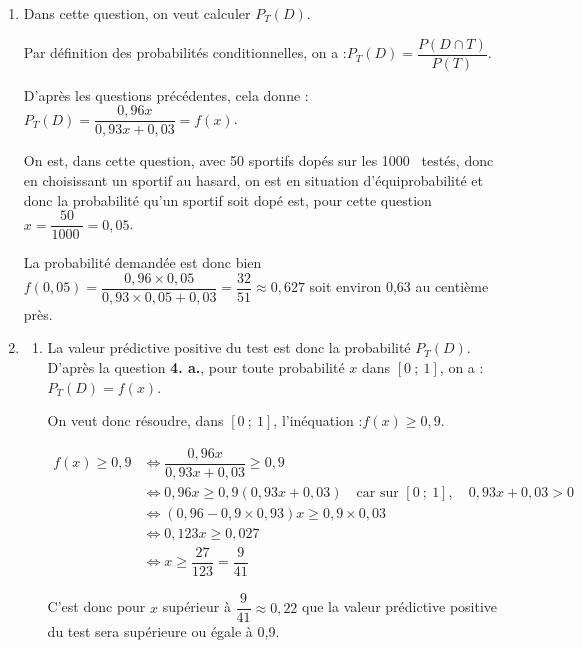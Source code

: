\documentclass[10pt]{article}
\providecommand{\np}[2][]{{#2~#1}}
\begin{document}
\begin{enumerate}
$\begin{aligned} P(T) &= P(D \cap T) + P(\overline{D} \cap T)\\
&= 0,96x + (1 - x) \times 0,03\\
&= 0,96x + 0,03 - 0,03x\\
&= 0,93x + 0,03\end{aligned}$

On arrive bien à la probabilité annoncée.

		\item Dans cette question, on veut calculer $P_T(D)$.

Par définition des probabilités conditionnelles, on a :\quad $P_T(D) = \dfrac{P(D \cap T)}{P(T)}$.

D'après les questions précédentes, cela donne :\quad $P_T(D) = \dfrac{0,96x}{0,93x + 0,03} = f(x)$.

On est, dans cette question, avec 50 sportifs dopés sur les \np{1000} testés, donc en choisissant un sportif au hasard, on est en situation d'équiprobabilité et donc la probabilité qu'un sportif soit dopé est, pour cette question $x = \dfrac{50}{\np{1000}} = 0,05$.

La probabilité demandée est donc bien $f(0,05) = \dfrac{0,96 \times 0,05}{0,93\times 0,05 + 0,03} = \dfrac{32}{51}\approx 0,627$ soit environ 0,63 au centième près.

		\item \begin{enumerate}
			\item La valeur prédictive positive du test est donc la probabilité $P_T(D)$. D'après la question \textbf{4. a.}, pour toute probabilité $x$ dans $ [0~;~1] $, on a :\quad $P_T(D)= f(x)$.

On veut donc résoudre, dans $ [0~;~1] $, l'inéquation :\quad $f(x) \geqslant 0,9$.

$\begin{aligned} f(x) \geqslant 0,9&\iff \dfrac{0,96x}{0,93x + 0,03 } \geqslant 0,9\\
&\iff 0,96x \geqslant 0,9 (0,93x+0,03) \quad \text{car sur } [0~;~1],\quad 0,93x + 0,03 >0\\
&\iff (0,96 - 0,9\times 0,93)x \geqslant 0,9\times 0,03\\
&\iff 0,123x \geqslant 0,027\\
&\iff x \geqslant \dfrac{27}{123}	=\dfrac{9}{41 }	\end{aligned} $

C'est donc pour $x$ supérieur à $ \dfrac{9}{41} \approx 0,22$ que la valeur prédictive positive du test sera supérieure ou égale à 0,9.


\end{enumerate}
\end{enumerate}
\end{document}
